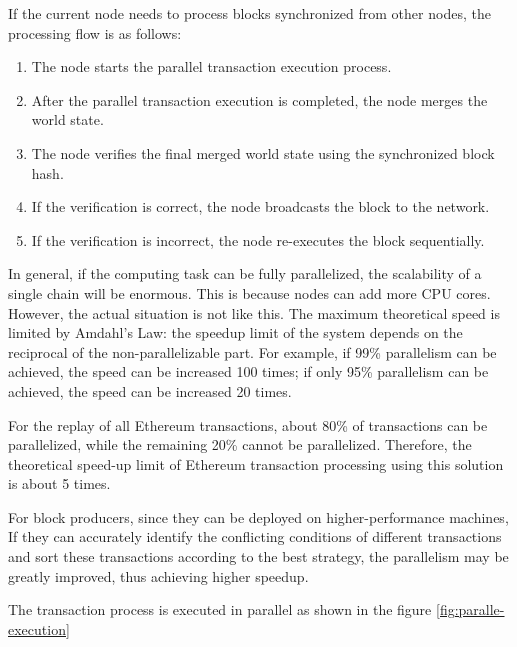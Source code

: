 If the current node needs to process blocks synchronized from other nodes, the processing flow is as follows:

\begin{enumerate}
    \item The node starts the parallel transaction execution process.
    \item After the parallel transaction execution is completed, the node merges the world state.
    \item The node verifies the final merged world state using the synchronized block hash.
    \item If the verification is correct, the node broadcasts the block to the network.
    \item If the verification is incorrect, the node re-executes the block sequentially.
\end{enumerate}

In general, if the computing task can be fully parallelized, the scalability of a single chain will be enormous. This is because nodes can add more CPU cores. However, the actual situation is not like this. The maximum theoretical speed is limited by Amdahl's Law\cite{website:Amdahls-law}: the speedup limit of the system depends on the reciprocal of the non-parallelizable part. For example, if 99\% parallelism can be achieved, the speed can be increased 100 times; if only 95\% parallelism can be achieved, the speed can be increased 20 times.

For the replay of all Ethereum transactions, about 80\% of transactions can be parallelized, while the remaining 20\% cannot be parallelized. Therefore, the theoretical speed-up limit of Ethereum transaction processing using this solution is about 5 times.

For block producers, since they can be deployed on higher-performance machines, If they can accurately identify the conflicting conditions of different transactions and sort these transactions according to the best strategy, the parallelism may be greatly improved, thus achieving higher speedup.

The transaction process is executed in parallel as shown in the figure \ref{fig:paralle-execution}

